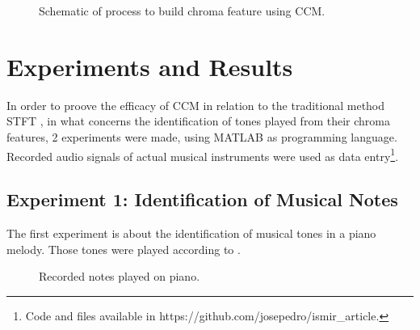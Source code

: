 \documentclass{article}
\begin{document}
	\begin{figure}[h!]
	 \centerline{}
	 \caption{Schematic of process to build chroma feature using CCM.}
	 \label{fig:schematic}
	\end{figure}


\section{Experiments and Results}

	In order to proove the efficacy of CCM in relation to the traditional method STFT \cite{LabROSA}, in what concerns the identification of tones played from their chroma features, 2 experiments were made, using MATLAB as programming language. Recorded audio signals of actual musical instruments were used as data entry\footnote{Code and files available in https://github.com/josepedro/ismir\_article.}. 

	
	\subsection{Experiment 1: Identification of Musical Notes}

	The first experiment is about the identification of musical tones in a piano melody. Those tones were played according to .

	\begin{figure}[h!]
	 \centerline{}
	 \caption{Recorded notes played on piano.}
	 \label{fig:1-notes}
	\end{figure}
\end{document}

